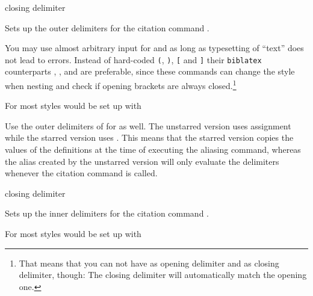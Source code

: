 \documentclass[DIV=9]{scrartcl}
\def\sty{\texttt}
\begin{document}
\begin{ltxsyntax}
        {closing delimiter}

Sets up the outer delimiters for the citation command
.

You may use almost arbitrary input for  and
 as long as typesetting of
\enquote{text} does not lead to
errors.
Instead of hard-coded \texttt{(}, \texttt{)}, \texttt{[} and \texttt{]} their
\sty{biblatex} counterparts , ,
 and  are preferable, since these
commands can change the style when nesting and check if opening brackets
are always closed.\footnote{That means that you can not have 
as opening delimiter and  as closing delimiter, though:
The closing delimiter will automatically match the opening one.}

For most styles  would be set up with
\begin{biblatexcode}
\end{biblatexcode}


Use the outer delimiters of  for
 as well.
The unstarred version uses  assignment while the starred version uses
. This means that the starred version copies the values of the
definitions at the time of executing the aliasing command,
whereas the alias created by the unstarred version will only evaluate the
delimiters whenever the citation command is called.


        {closing delimiter}

Sets up the inner delimiters for the citation command
.

For most styles  would be set up with
\begin{biblatexcode}
\end{biblatexcode}


\end{ltxsyntax}
\end{document}
